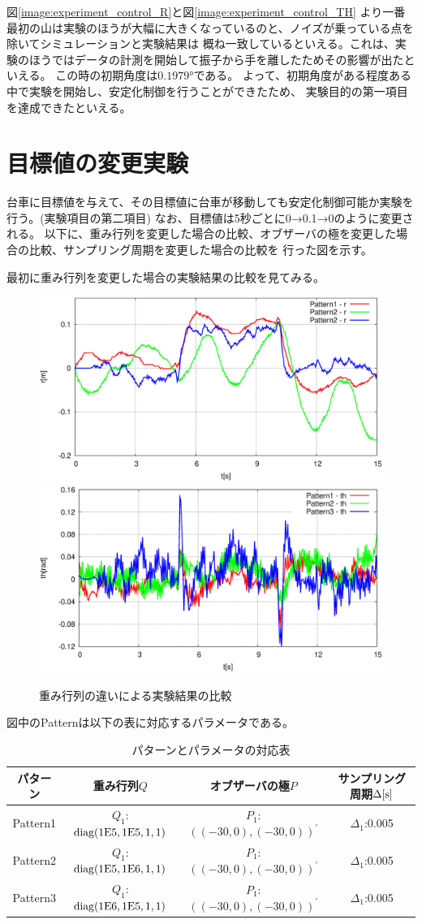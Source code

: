 	図\ref{image:experiment_control_R}と図\ref{image:experiment_control_TH}
	より一番最初の山は実験のほうが大幅に大きくなっているのと、ノイズが乗っている点を除いてシミュレーションと実験結果は
	概ね一致しているといえる。これは、実験のほうではデータの計測を開始して振子から手を離したためその影響が出たといえる。
	この時の初期角度は$0.1979°$である。%
	よって、初期角度がある程度ある中で実験を開始し、安定化制御を行うことができたため、
	実験目的の第一項目を達成できたといえる。
	
	
	
\section{目標値の変更実験}
	台車に目標値を与えて、その目標値に台車が移動しても安定化制御可能か実験を行う。(実験項目の第二項目)
	なお、目標値は5秒ごとに0→0.1→0のように変更される。
	以下に、重み行列を変更した場合の比較、オブザーバの極を変更した場合の比較、サンプリング周期を変更した場合の比較を
	行った図を示す。
	\par
	最初に重み行列を変更した場合の実験結果の比較を見てみる。
	\begin{figure}[H]
		\centering
		\includegraphics[width=0.4\linewidth]{gazo/Compare_Q_R.eps}
		\includegraphics[width=0.4\linewidth]{gazo/Compare_Q_TH.eps}
		\caption{重み行列の違いによる実験結果の比較}
		\label{image:comp_Q}
	\end{figure}
	図中のPatternは以下の表に対応するパラメータである。
	\begin{table}[H]
		\begin{center}
			\caption{パターンとパラメータの対応表}
			\medskip
			
			\begin{tabular}{|c|c|c|c|}\hline
				パターン & 重み行列$Q$ & オブザーバの極$P$ & サンプリング周期$\Delta[\rm{s}]$ \\ \hline\hline
				Pattern1 & $Q_1$:$\rm{diag}(1E5,1E5,1,1)$ & $P_1$:$((-30,0),(-30,0))^{'}$ & $\Delta_1$:0.005 \\ \hline
				Pattern2 & $Q_1$:$\rm{diag}(1E5,1E6,1,1)$ & $P_1$:$((-30,0),(-30,0))^{'}$ & $\Delta_1$:0.005 \\ \hline
				Pattern3 & $Q_1$:$\rm{diag}(1E6,1E5,1,1)$ & $P_1$:$((-30,0),(-30,0))^{'}$ & $\Delta_1$:0.005 \\ \hline
			\end{tabular}
		\end{center}
		\label{table:huriage_control}
	\end{table}
